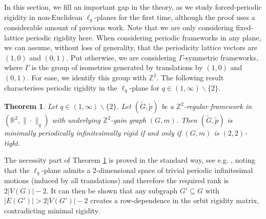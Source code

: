\documentclass[reqno,a4paper,10pt]{article}
\newtheorem{theorem}{Theorem}[section]
\theoremstyle{definition}
\theoremstyle{remark}
\numberwithin{equation}{section}
\numberwithin{figure}{section}
\numberwithin{table}{section}
\newcommand{\R}{\mathbb{R}}
\newcommand{\Z}{\mathbb{Z}}
\newcommand{\G}{\tilde{G}}
\newcommand{\p}{\tilde{p}}
\begin{document}
    In this section, we fill an important gap in the theory, as we study forced-periodic rigidity in non-Euclidean $\ell_q$-planes for the first time, although the proof uses a considerable amount of previous work. Note that we are only considering fixed-lattice periodic rigidity here. When considering periodic frameworks in any plane, we can assume, without loss of generality, that the periodicity lattice vectors are $(1,0)$ and $(0,1)$. Put otherwise, we are considering $\Gamma$-symmetric frameworks, where $\Gamma$ is the group of isometries generated by translations by $(1,0)$ and $(0,1)$. For ease, we identify this group with $\Z^2$. The following result characterises periodic rigidity in the  $\ell_q$-plane for $q\in(1,\infty)\backslash\{2\}$. 
    \begin{theorem}\label{lqPeriodic}
        Let $q\in(1,\infty)\backslash\{2\}$. Let $(\G,\p)$ be a $\Z^2$-regular framework in $(\R^2,\|\cdot\|_q)$ with underlying $\Z^2$-gain graph $(G,m)$. Then $(\G,\p)$ is minimally periodically infinitesimally rigid if and only if $(G,m)$ is $(2,2)$-tight.
    \end{theorem}
    
    The necessity part of Theorem \ref{lqPeriodic} is proved in the standard way, see e.g. \cite{NonEuclidean}, noting that the $\ell_q$-plane admits a $2$-dimensional space of trivial periodic infinitesimal motions (induced by all translations) and therefore the required rank is $2|V(G)|-2$. It can then be shown that any subgraph $G'\subseteq G$ with $|E(G')|>2|V(G')|-2$ creates a row-dependence in the orbit rigidity matrix, contradicting minimal rigidity.
\end{document}
